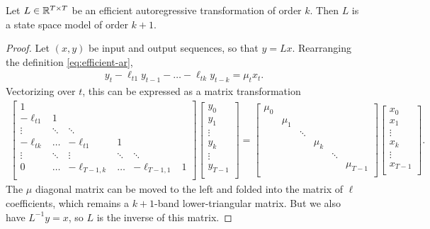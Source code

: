 \begin{theorem}
  \label{thm:ss-sma-formal}
  Let $L \in \mathbb{R}^{T \times T}$ be an efficient autoregressive transformation of order $k$.
  Then $L$ is a state space model of order $k+1$.
\end{theorem}
\begin{proof}
  Let $(x, y)$ be input and output sequences, so that $y = Lx$.
  Rearranging the definition \eqref{eq:efficient-ar},
  \begin{align*}
    y_t - \ell_{t1} y_{t-1} - \dots - \ell_{tk} y_{t-k} = \mu_t x_t
    .
  \end{align*}
  Vectorizing over $t$, this can be expressed as a matrix transformation
  \begin{align*}%
    \begin{bmatrix}
      1 & \\
      -\ell_{t1} & 1 \\
      \vdots & \ddots & \ddots \\
      -\ell_{tk} & \dots & -\ell_{t1} & 1 \\
      \vdots & \ddots & \vdots & \ddots & \ddots \\
      0 & \dots & -\ell_{T-1,k} & \dots & -\ell_{T-1,1} & 1 \\
    \end{bmatrix}
    \begin{bmatrix}
      y_0 \\
      y_1 \\
      \vdots \\
      y_k \\
      \vdots \\
      y_{T-1} \\
    \end{bmatrix}
    =
    \begin{bmatrix}
      \mu_0 \\
      & \mu_1 \\
      & & \ddots \\
      & & & \mu_k \\
      & & & & \ddots \\
      & & & & & \mu_{T-1} \\
    \end{bmatrix}
    \begin{bmatrix}
      x_0 \\
      x_1 \\
      \vdots \\
      x_k \\
      \vdots \\
      x_{T-1} \\
    \end{bmatrix}
    .
  \end{align*}
  The $\mu$ diagonal matrix can be moved to the left and folded into the matrix of $\ell$ coefficients,
  which remains a $k+1$-band lower-triangular matrix.
  But we also have $L^{-1} y = x$, so $L$ is the inverse of this matrix.


\end{proof}
